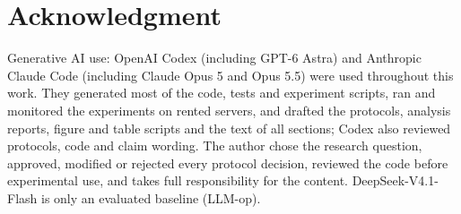 \section*{Acknowledgment}
Generative AI use: OpenAI Codex (including GPT-6 Astra) and Anthropic Claude Code (including Claude Opus 5 and
Opus 5.5) were used throughout this work. They generated most of the code, tests and experiment scripts, ran and
monitored the experiments on rented servers, and drafted the protocols, analysis reports, figure and table scripts and
the text of all sections; Codex also reviewed protocols, code and claim wording. The author chose the research
question, approved, modified or rejected every protocol decision, reviewed the code before experimental use, and takes
full responsibility for the content. DeepSeek-V4.1-Flash is only an evaluated baseline (LLM-op).
